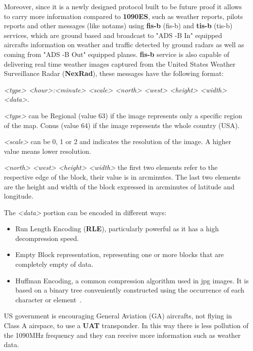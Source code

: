 \documentclass[../main.tex]{subfiles}
\begin{document}
Moreover, since it is a newly designed protocol built to be future proof it allows to carry more information compared to \textbf{1090ES}, such as weather reports, pilots reports and other messages (like \acrshort{notam}s) using  \textbf{\acrshort{fis-b}} (\acrlong{fis-b}) and \textbf{\acrshort{tis-b}} (\acrlong{tis-b}) services, which are ground based and broadcast to "ADS -B In" equipped aircrafts information on weather and traffic detected by ground radars as well as coming from "ADS -B Out" equipped planes. \textbf{\acrshort{fis-b}} service is also capable of delivering real time weather images captured from the United States Weather Surveillance Radar (\textbf{NexRad}), these messages have the following format:

\emph{<type> <hour>:<minute> <scale> <north> <west> <height> <width> <data>}.

\medskip

\emph{<type>} can be Regional (value 63) if the image represents only a specific region of the map. Conus (value 64) if the image represents the whole country (USA).

\emph{<scale>} can be 0, 1 or 2 and indicates the resolution of the image. A higher value means lower resolution.

\emph{<north> <west> <height> <width>} the first two elements refer to the respective edge of the block, their value is in arcminutes. The last two elements are the height and width of the block expressed in arcminutes of latitude and longitude.

The \emph{<data>} portion can be encoded in different ways:

\begin{itemize}
  \item Run Length Encoding (\textbf{RLE}), particularly powerful as it has a high decompression speed.

  \item Empty Block representation, representing one or more blocks that are completely empty of data.

  \item Huffman Encoding, a common compression algorithm used in jpg images. It is based on a binary tree conveniently constructed using the occurrence of each character or element~\cite{huffman}.

\end{itemize}

US government is encouraging General Aviation (GA) aircrafts, not flying in Class A airspace, to use a \textbf{UAT} transponder. In this way there is less pollution of the 1090MHz frequency and they can receive more information such as weather data.
\end{document}
